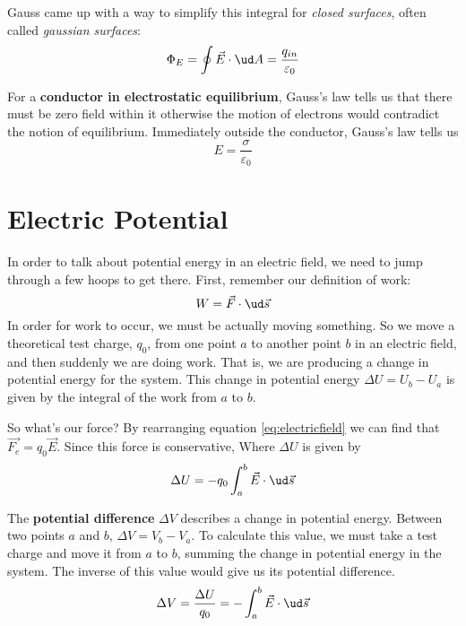 Gauss came up with a way to simplify this integral for \emph{closed surfaces},
often called \emph{gaussian surfaces}:
\begin{equation}
  \label{eq:gausslaw}
  \Phi_E = \oint \vec E \cdot \ud A = \frac{q_{in}}{\varepsilon_0}
\end{equation}

For a \textbf{conductor in electrostatic equilibrium}, Gauss's law tells us that
there must be zero field within it otherwise the motion of electrons would
contradict the notion of equilibrium. Immediately outside the conductor, Gauss's
law tells us
\begin{equation}
  E = \frac{\sigma}{\varepsilon_0}
\end{equation}

\section{Electric Potential}

In order to talk about potential energy in an electric field, we need to jump
through a few hoops to get there. First, remember our definition of
work:
\[ W = \vec{F} \cdot \ud \vec s \]
In order for work to occur, we must be actually moving something. So we move a
theoretical test charge, $q_0$, from one point $a$ to another point $b$ in an
electric field, and then suddenly we are doing work. That is, we are producing a
change in potential energy for the system. This change in potential energy
$\Delta U = U_b - U_a$ is given by the integral of the work from $a$ to $b$.

So what's our force? By rearranging equation \eqref{eq:electricfield} we can
  find that $\vec{F_e} = q_0 \vec{E}$. Since this force is conservative,
Where $\Delta U$ is given by
\begin{equation}
  \Delta U = -q_0 \int_{a}^{b} \vec{E} \cdot \ud \vec{s}
\end{equation}

The \textbf{potential difference} $\Delta V$ describes a change in potential
energy. Between two points $a$ and $b$, $\Delta V = V_b - V_a$. To calculate
this value, we must take a test charge and move it from $a$ to $b$, summing the
change in potential energy in the system. The inverse of this value would give
us its potential difference.
\begin{equation}
  \label{eq:potentialdifference}
  \Delta V = \frac{\Delta U}{q_0} = -\int_{a}^{b} \vec{E} \cdot \ud \vec{s} 
\end{equation}

